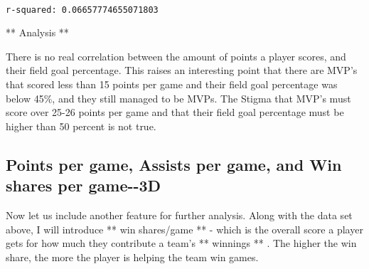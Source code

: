 \documentclass[11pt]{article}
\begin{document}
    \begin{center}
    \end{center}
    { \hspace*{\fill} \\}
    
    \begin{Verbatim}[commandchars=\\\{\}]
r-squared: 0.06657774655071803

    \end{Verbatim}

    ** Analysis **

There is no real correlation between the amount of points a player
scores, and their field goal percentage. This raises an interesting
point that there are MVP's that scored less than 15 points per game and
their field goal percentage was below 45\%, and they still managed to be
MVPs. The Stigma that MVP's must score over 25-26 points per game and
that their field goal percentage must be higher than 50 percent is not
true.

\subsection{Points per game, Assists per game, and Win shares per
game-\/-3D}\label{points-per-game-assists-per-game-and-win-shares-per-game--3d}

Now let us include another feature for further analysis. Along with the
data set above, I will introduce ** win shares/game ** - which is the
overall score a player gets for how much they contribute a team's **
winnings ** . The higher the win share, the more the player is helping
the team win games.
\end{document}
